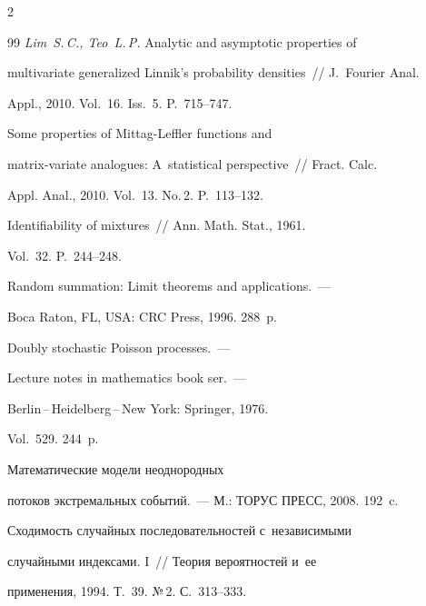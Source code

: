 \begin{multicols}{2}
{{\begin{thebibliography}{99}
 {\it Lim~S.\,C., Teo~L.\,P.} Analytic and asymptotic properties of


multivariate generalized Linnik's probability densities~// J.~Fourier Anal.


Appl., 2010. Vol.~16. Iss.~5. P.~715--747.







 Some properties of Mittag-Leffler functions and


matrix-variate analogues: A~statistical perspective~// Fract. Calc. 


Appl. Anal., 2010. Vol.~13. No.\,2. P.~113--132.







 Identifiability of mixtures~// Ann. Math. Stat., 1961. 


Vol.~32. P.~244--248.







 Random summation: Limit theorems and applications.~--- 


Boca Raton, FL, USA: CRC Press, 1996. 288~p.







 Doubly stochastic Poisson processes.~--- 


Lecture notes in mathematics book ser.~--- 


Berlin\,--\,Heidelberg\,--\,New York: Springer, 1976. 


Vol.~529. 244~p. 







 Математические модели неоднородных 


потоков экстремальных событий.~--- М.: ТОРУС ПРЕСС, 2008. 192~c.







 Сходимость случайных последовательностей с~независимыми


случайными индексами. I~// Теория вероятностей и~ее 


применения, 1994. Т.~39. №\,2. С.~313--333.


 \end{thebibliography}





 }


 }





\end{multicols}
